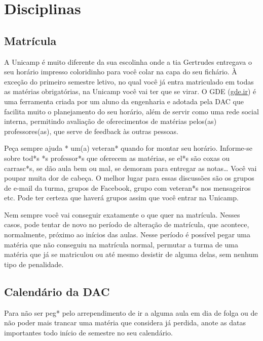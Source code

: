 
\section{Disciplinas}

\subsection{Matrícula}

A Unicamp é muito diferente da sua escolinha onde a tia Gertrudes entregava o
seu horário impresso coloridinho para você colar na capa do seu fichário.  À
exceção do primeiro semestre letivo, no qual você já entra matriculado em todas
as matérias obrigatórias, na Unicamp você vai ter que se virar.  O GDE
(\url{gde.ir}) é uma ferramenta criada por um aluno da engenharia e adotada
pela DAC que facilita muito o planejamento do seu horário, além de servir como
uma rede social interna, permitindo avaliação de oferecimentos de matérias
pelos(as) professores(as), que serve de feedback às outras pessoas.

Peça sempre ajuda * um(a) veteran* quando for montar seu horário. Informe-se
sobre tod*s *s professor*s que oferecem as matérias, se el*s são coxas ou
carrasc*s, se dão aula bem ou mal, se demoram para entregar as notas{\dots}
Você vai poupar muita dor de cabeça. O melhor lugar para essas discussões são
os grupos de e-mail da turma, grupos de Facebook, grupo com veteran*s nos
mensageiros etc. Pode ter certeza que haverá grupos assim que você entrar na
Unicamp.

Nem sempre você vai conseguir exatamente o que quer na matrícula. Nesses casos,
pode tentar de novo no período de alteração de matrícula, que acontece,
normalmente, próximo ao inícios das aulas. Nesse período é possível pegar uma
matéria que não conseguiu na matrícula normal, permutar a turma de uma matéria
que já se matriculou ou até mesmo desistir de alguma delas, sem nenhum tipo de
penalidade.

\subsection{Calendário da DAC}

Para não ser peg* pelo arrependimento de ir a alguma aula em dia de folga ou de
não poder mais trancar uma matéria que considera já perdida, anote as datas
importantes todo início de semestre no seu calendário.

